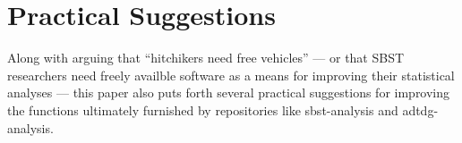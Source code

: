 
\vspace*{-.5em}

\section{Practical Suggestions}
\label{sec:suggestions}


Along with arguing that ``hitchikers need free vehicles'' --- or that SBST researchers need freely availble software as a means for
improving their statistical analyses --- this paper also puts forth several practical suggestions for improving the
functions ultimately furnished by repositories like sbst-analysis and adtdg-analysis.
